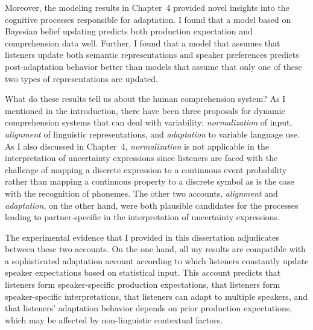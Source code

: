 Moreover, the modeling results in Chapter~4 provided novel insights into the cognitive processes responsible for adaptation. I found that a model based on Bayesian belief updating predicts both production expectation and comprehension data well. Further, I found that a model that assumes that listeners update both semantic representations and speaker preferences predicts post-adaptation behavior better than models that assume that only one of these two types of representations are updated.

What do these results tell us about the human comprehension system? As I mentioned in the introduction, there have been three proposals for dynamic comprehension systems that can deal with variability: \textit{normalization} of input, \textit{alignment} of linguistic representations, and \textit{adaptation} to variable language use. As I also discussed in Chapter~4, \textit{normalization} is not applicable in the interpretation of uncertainty expressions since listeners are faced with the challenge of mapping a discrete expression to a continuous event probability rather than mapping a continuous property to a discrete symbol as is the case with the recognition of phonemes. The other two accounts, \textit{alignment} and \textit{adaptation}, on the other hand, were both plausible candidates for the processes leading to partner-specific in the interpretation of uncertainty expressions.

The experimental evidence that I provided in this dissertation adjudicates between these two accounts. On the one hand, all my results are compatible with a sophisticated adaptation account according to which listeners constantly update speaker expectations based on statistical input. This account predicts that listeners form speaker-specific production expectations, that listeners form speaker-specific interpretations, that listeners can adapt to multiple speakers, and that listeners' adaptation behavior depends on prior production expectations, which may be affected by non-linguistic contextual factors.

